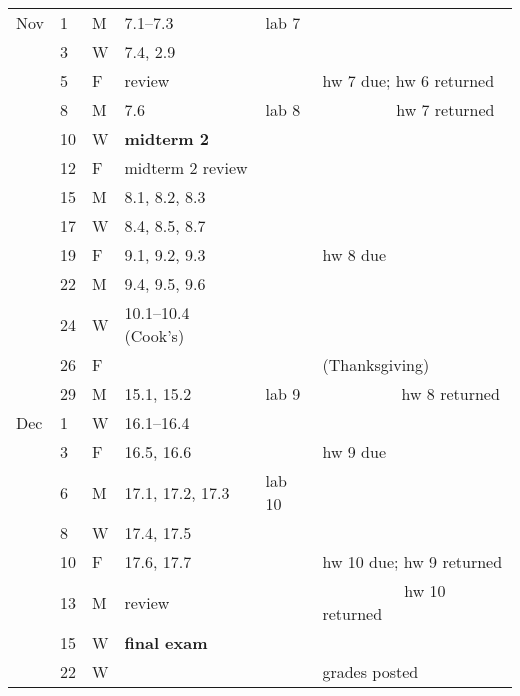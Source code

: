 \documentclass{article}
\begin{document}
\begin{center}
\begin{tabular*}{0.99\textwidth}{%
    p{}p{}p{}
    |p{}
    |p{}
    |p{}}
Nov
& 1 & M & 7.1--7.3 & lab 7 & \\
& 3 & W & 7.4, 2.9 & & \\
& 5 & F & review & & hw 7 due; hw 6 returned \\ \hline
& 8 & M & 7.6 & lab 8 & $\phantom{\textrm{hw 7 due; }}$hw 7 returned\\
& 10 & W & \textbf{midterm 2} & & \\
& 12 & F & midterm 2 review & & \\ \hline
& 15 & M & 8.1, 8.2, 8.3 & & \\
& 17 & W & 8.4, 8.5, 8.7 & & \\
& 19 & F & 9.1, 9.2, 9.3 & & hw 8 due\\ \hline
& 22 & M & 9.4, 9.5, 9.6 & & \\
& 24 & W & 10.1--10.4 (Cook's) & & \\
& 26 & F & & & (Thanksgiving)\\ \hline
& 29 & M & 15.1, 15.2 & lab 9 &
    $\phantom{\textrm{hw 8 due; }}$ hw 8 returned\\
Dec
& 1 & W & 16.1--16.4 & & \\
& 3 & F & 16.5, 16.6 & & hw 9 due \\ \hline
& 6 & M & 17.1, 17.2, 17.3 & lab 10 & \\
& 8 & W & 17.4, 17.5 & & \\
& 10 & F & 17.6, 17.7 & & hw 10 due; hw 9 returned \\ \hline
& 13 & M & review & & $\phantom{\textrm{hw 10 due; }}$hw 10 returned\\
& 15 & W & \textbf{final exam} & & \\ \hline
& 22 & W & & & grades posted
\end{tabular*}
\end{center}
\end{document}
